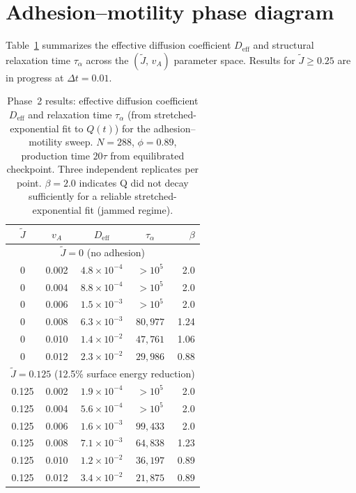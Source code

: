 \documentclass[aps,pre,twocolumn,superscriptaddress,longbibliography,floatfix]{revtex4-2}
\newcommand{\vA}{v_{\!A}}                  %
\newcommand{\Jt}{\tilde{J}}               %
\begin{document}
\section{Adhesion--motility phase diagram}
\label{sec:diagram}

Table~\ref{tab:phase2} summarizes the effective diffusion coefficient
$D_{\mathrm{eff}}$ and structural relaxation time $\tau_\alpha$
across the $(\Jt,\,\vA)$ parameter space.  Results for
$\Jt \geq 0.25$ are in progress at $\Delta t = 0.01$.

\begin{table}[t]
\caption{Phase~2 results: effective diffusion coefficient
  $D_{\mathrm{eff}}$ and relaxation time $\tau_\alpha$ (from
  stretched-exponential fit to $Q(t)$) for the adhesion--motility
  sweep.  $N = 288$, $\phi = 0.89$, production time $20\tau$ from
  equilibrated checkpoint.  Three independent replicates per point.
  $\beta = 2.0$ indicates Q did not decay sufficiently for a reliable
  stretched-exponential fit (jammed regime).}
\label{tab:phase2}
\begin{ruledtabular}
\begin{tabular}{ccccr}
$\Jt$ & $\vA$ & $D_{\mathrm{eff}}$ & $\tau_\alpha$ & $\beta$ \\
\midrule
\multicolumn{5}{c}{$\Jt = 0$ (no adhesion)} \\
0 & 0.002 & $4.8\times10^{-4}$ & $>10^5$ & 2.0 \\
0 & 0.004 & $8.8\times10^{-4}$ & $>10^5$ & 2.0 \\
0 & 0.006 & $1.5\times10^{-3}$ & $>10^5$ & 2.0 \\
0 & 0.008 & $6.3\times10^{-3}$ & $80{,}977$ & 1.24 \\
0 & 0.010 & $1.4\times10^{-2}$ & $47{,}761$ & 1.06 \\
0 & 0.012 & $2.3\times10^{-2}$ & $29{,}986$ & 0.88 \\
\midrule
\multicolumn{5}{c}{$\Jt = 0.125$ (12.5\% surface energy reduction)} \\
0.125 & 0.002 & $1.9\times10^{-4}$ & $>10^5$ & 2.0 \\
0.125 & 0.004 & $5.6\times10^{-4}$ & $>10^5$ & 2.0 \\
0.125 & 0.006 & $1.6\times10^{-3}$ & $99{,}433$ & 2.0 \\
0.125 & 0.008 & $7.1\times10^{-3}$ & $64{,}838$ & 1.23 \\
0.125 & 0.010 & $1.2\times10^{-2}$ & $36{,}197$ & 0.89 \\
0.125 & 0.012 & $3.4\times10^{-2}$ & $21{,}875$ & 0.89 \\
\end{tabular}
\end{ruledtabular}
\end{table}
\end{document}
